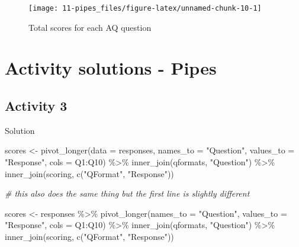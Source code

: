 \documentclass[
  oneside]{book}
\newenvironment{Shaded}{\begin{snugshade}}{\end{snugshade}}
\newcommand{\AttributeTok}[1]{\textcolor[rgb]{0.77,0.63,0.00}{#1}}
\newcommand{\CommentTok}[1]{\textcolor[rgb]{0.56,0.35,0.01}{\textit{#1}}}
\newcommand{\FunctionTok}[1]{\textcolor[rgb]{0.00,0.00,0.00}{#1}}
\newcommand{\NormalTok}[1]{#1}
\newcommand{\OtherTok}[1]{\textcolor[rgb]{0.56,0.35,0.01}{#1}}
\newcommand{\SpecialCharTok}[1]{\textcolor[rgb]{0.00,0.00,0.00}{#1}}
\newcommand{\StringTok}[1]{\textcolor[rgb]{0.31,0.60,0.02}{#1}}
\begin{document}
\begin{figure}

{\centering \texttt{[image: 11-pipes\_files/figure-latex/unnamed-chunk-10-1]} 

}

\caption{Total scores for each AQ question}\label{fig:unnamed-chunk-10}
\end{figure}

\hypertarget{activity-solutions---pipes}{%
\section{Activity solutions - Pipes}\label{activity-solutions---pipes}}

\hypertarget{activity-3-3}{%
\subsection{Activity 3}\label{activity-3-3}}

Solution

\begin{Shaded}
\begin{Highlighting}[]
\NormalTok{scores }\OtherTok{\textless{}{-}} \FunctionTok{pivot\_longer}\NormalTok{(}\AttributeTok{data =}\NormalTok{ responses, }
                      \AttributeTok{names\_to =} \StringTok{"Question"}\NormalTok{,  }
                      \AttributeTok{values\_to =} \StringTok{"Response"}\NormalTok{,}
                      \AttributeTok{cols =}\NormalTok{ Q1}\SpecialCharTok{:}\NormalTok{Q10) }\SpecialCharTok{\%\textgreater{}\%}
  \FunctionTok{inner\_join}\NormalTok{(qformats, }\StringTok{"Question"}\NormalTok{) }\SpecialCharTok{\%\textgreater{}\%}
  \FunctionTok{inner\_join}\NormalTok{(scoring, }\FunctionTok{c}\NormalTok{(}\StringTok{"QFormat"}\NormalTok{, }\StringTok{"Response"}\NormalTok{))}

\CommentTok{\# this also does the same thing but the first line is slightly different}

\NormalTok{scores }\OtherTok{\textless{}{-}}\NormalTok{ responses }\SpecialCharTok{\%\textgreater{}\%}
  \FunctionTok{pivot\_longer}\NormalTok{(}\AttributeTok{names\_to =} \StringTok{"Question"}\NormalTok{,  }
               \AttributeTok{values\_to =} \StringTok{"Response"}\NormalTok{,}
               \AttributeTok{cols =}\NormalTok{ Q1}\SpecialCharTok{:}\NormalTok{Q10) }\SpecialCharTok{\%\textgreater{}\%}
  \FunctionTok{inner\_join}\NormalTok{(qformats, }\StringTok{"Question"}\NormalTok{) }\SpecialCharTok{\%\textgreater{}\%}
  \FunctionTok{inner\_join}\NormalTok{(scoring, }\FunctionTok{c}\NormalTok{(}\StringTok{"QFormat"}\NormalTok{, }\StringTok{"Response"}\NormalTok{))}
\end{Highlighting}
\end{Shaded}
\end{document}
